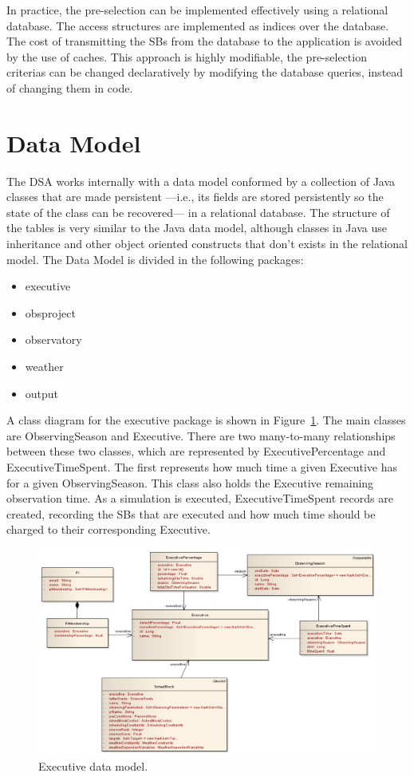 \documentclass{article}
\begin{document}
In practice, the pre-selection can be implemented effectively using a relational
database. The access structures are implemented as indices over the database. The
cost of transmitting the SBs from the database to the application is avoided by the
use of caches. This approach is highly modifiable, the pre-selection criterias can
be changed declaratively by modifying the database queries, instead of changing them
in code.

\section{Data Model}

The DSA works internally with a data model conformed by a collection of Java classes that are made
persistent ---i.e., its fields are stored persistently so the state of the class can be recovered--- in
a relational database. The structure of the tables is very similar to the Java data model, although
classes in Java use inheritance and other object oriented constructs that don't exists in the relational model.
The Data Model is divided in the following packages:
\begin{itemize}
\item executive
\item obsproject
\item observatory
\item weather
\item output
\end{itemize}

A class diagram for the executive package is shown in Figure~\ref{fig:executivedm}. The main classes are ObservingSeason and
Executive. There are two many-to-many relationships between these two classes, which are represented
by ExecutivePercentage and ExecutiveTimeSpent. The first represents how much time a given Executive
has for a given ObservingSeason. This class also holds the Executive remaining observation time. As a
simulation is executed, ExecutiveTimeSpent records are created, recording the SBs that are executed and
how much time should be charged to their corresponding Executive.

\begin{figure}
\includegraphics[width=\textwidth]{Executive.pdf}
\caption{Executive data model.}
\label{fig:executivedm}
\end{figure}
\end{document}
